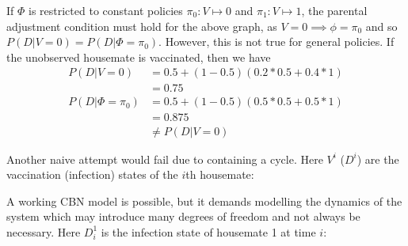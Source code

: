 If $\Phi$ is restricted to constant policies $\pi_0:V\mapsto 0$ and $\pi_1:V\mapsto 1$, the parental adjustment condition must hold for the above graph, as $V=0\implies \phi=\pi_0$ and so $P(D|V=0)=P(D|\Phi=\pi_0)$. However, this is not true for general policies. If the unobserved housemate is vaccinated, then we have
\begin{align}
    P(D|V=0) &= 0.5 + (1-0.5)(0.2*0.5+0.4*1) \\
             &= 0.75 \\
    P(D|\Phi=\pi_0) &= 0.5 + (1-0.5)(0.5*0.5 + 0.5*1) \\
            &= 0.875 \\
            &\neq P(D|V=0)
\end{align}

Another naive attempt would fail due to containing a cycle. Here $V^i$ ($D^i$) are the vaccination (infection) states of the $i$th housemate:

\begin{center}
\end{center}

A working CBN model is possible, but it demands modelling the dynamics of the system which may introduce many degrees of freedom and not always be necessary. Here $D^1_i$ is the infection state of housemate 1 at time $i$:

\begin{center}
\end{center}

